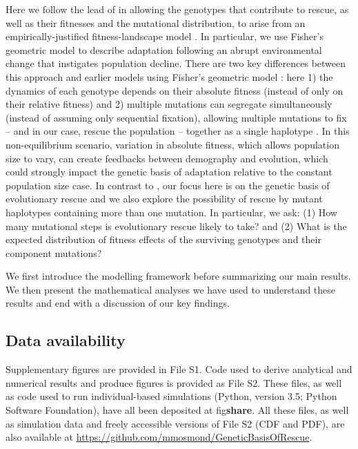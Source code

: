 \documentclass[9pt,twocolumn,twoside,lineno]{gsajnl}
\begin{document}
Here we follow the lead of \cite{Anciaux2018} in allowing the genotypes that contribute to rescue, as well as their fitnesses and the mutational distribution, to arise from an empirically-justified fitness-landscape model \citep{Tenaillon2014}.
In particular, we use Fisher's geometric model to describe adaptation following an abrupt environmental change that instigates population decline.
There are two key differences between this approach and earlier models using Fisher's geometric model \citep[e.g.,][]{Orr1998}:
here
1) the dynamics of each genotype depends on their absolute fitness (instead of only on their relative fitness) and
2) multiple mutations can segregate simultaneously (instead of assuming only sequential fixation), allowing multiple mutations to fix -- and in our case, rescue the population -- together as a single haplotype \citep[i.e., stochastic tunnelling,][]{iwasa2004stochastic}.
In this non-equilibrium scenario, variation in absolute fitness, which allows population size to vary, can create feedbacks between demography and evolution, which could strongly impact the genetic basis of adaptation relative to the constant population size case.
In contrast to \cite{Anciaux2018}, our focus here is on the genetic basis of evolutionary rescue and we also explore the possibility of rescue by mutant haplotypes containing more than one mutation.
In particular, we ask: (1) How many mutational steps is evolutionary rescue likely to take? and (2) What is the expected distribution of fitness effects of the surviving genotypes and their component mutations?

We first introduce the modelling framework before summarizing our main results.
We then present the mathematical analyses we have used to understand these results and end with a discussion of our key findings.

\subsection{Data availability}

Supplementary figures are provided in File S1.
Code used to derive analytical and numerical results and produce figures \citep[\textit{Mathematica}, version 9.0;][]{Mathematica} is provided as File S2.
These files, as well as code used to run individual-based simulations (Python, version 3.5; Python Software Foundation), have all been deposited at fig\textbf{share}.
All these files, as well as simulation data and freely accessible versions of File S2 (CDF and PDF), are also available at \url{https://github.com/mmosmond/GeneticBasisOfRescue}.
\end{document}
